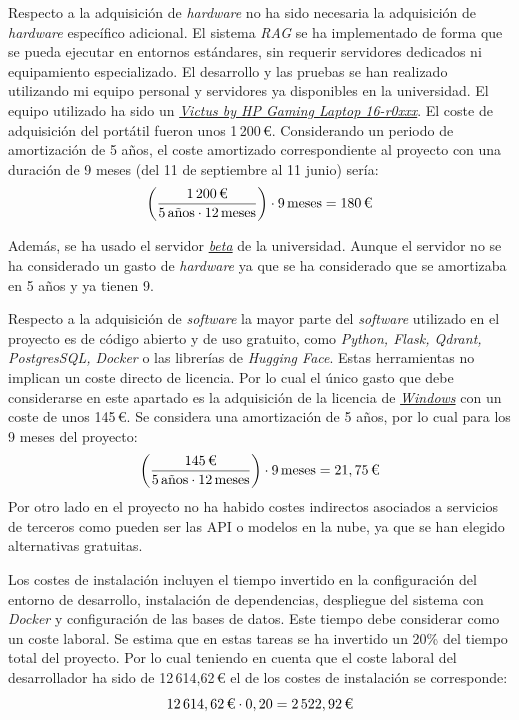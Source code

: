 Respecto a la adquisición de \textit{hardware} no ha sido necesaria la adquisición de \textit{hardware} específico adicional. El sistema \textit{RAG} se ha implementado de forma que se pueda ejecutar en entornos estándares, sin requerir servidores dedicados ni equipamiento especializado. El desarrollo y las pruebas se han realizado utilizando mi equipo personal y servidores ya disponibles en la universidad. El equipo utilizado ha sido un \href{https://support.hp.com/es-es/document/ish_7878690-7886844-16}{\textit{Victus by HP Gaming Laptop 16-r0xxx}}. El coste de adquisición del portátil fueron unos 1\,200\,€. Considerando un periodo de amortización de 5 años, el coste amortizado correspondiente al proyecto con una duración de 9 meses (del 11 de septiembre al 11 junio) sería:
$$
\left(\frac{1\,200\,\text{\texteuro}}{5\,\text{años} \cdot 12\,\text{meses}}\right)\cdot 9\,\text{meses}
= 180\,\text{\texteuro}
$$

Además, se ha usado el servidor \href{https://www.gigabyte.com/es/Enterprise/Server-Motherboard/MW51-HP0-rev-1x}{\textit{beta}} de la universidad. Aunque el servidor no se ha considerado un gasto de \textit{hardware} ya que se ha considerado que se amortizaba en 5 años y ya tienen 9.

Respecto a la adquisición de \textit{software} la mayor parte del \textit{software} utilizado en el proyecto es de código abierto y de uso gratuito, como \textit{Python, Flask, Qdrant, PostgresSQL, Docker} o las librerías de \textit{Hugging Face}. Estas herramientas no implican un coste directo de licencia. Por lo cual el único gasto que debe considerarse en este apartado es la adquisición de la licencia de 
\href{https://www.microsoft.com/es-es/d/windows-11-home/dg7gmgf0krt0/000P}{\textit{Windows}} con un coste de unos 145\,€. Se considera una amortización de 5 años, por lo cual para los 9 meses del proyecto:
$$
\left(\frac{145\,\text{\texteuro}}{5\,\text{años} \cdot 12\,\text{meses}}\right)\cdot 9\,\text{meses}
= 21,75\,\text{\texteuro}
$$
Por otro lado en el proyecto no ha habido costes indirectos asociados a servicios de terceros como pueden ser las API o modelos en la nube, ya que se han elegido alternativas gratuitas.

Los costes de instalación incluyen el tiempo invertido en la configuración del entorno de desarrollo, instalación de dependencias, despliegue del sistema con \textit{Docker} y configuración de las bases de datos. Este tiempo debe considerar como un coste laboral. Se estima que en estas tareas se ha invertido un 20\% del tiempo total del proyecto. Por lo cual teniendo en cuenta que el coste laboral del desarrollador ha sido de 12\,614,62\,€ el de los costes de instalación se corresponde:
$$
12\,614,62\,\text{\texteuro} \cdot 0,20
= 2\,522,92\,\text{\texteuro}
$$

